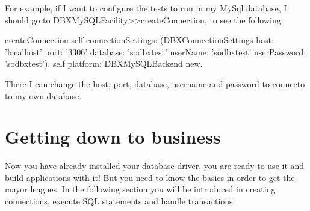 \documentclass[a4paper,10pt,twoside]{book}
\begin{document}
For example, if I want to configure the tests to run in my MySql database, I should go to DBXMySQLFacility>>createConnection, to see the following:

\begin{code}
createConnection
    self connectionSettings: (DBXConnectionSettings
			    host: 'localhost'
			    port: '3306'
			    database: 'sodbxtest'
			    userName: 'sodbxtest'
			    userPassword: 'sodbxtest').
    self platform: DBXMySQLBackend new.
\end{code}

There I can change the host, port, database, username and password to connecto to my own database.

\section{Getting down to business}

Now you have already installed your database driver, you are ready to use it and build applications with it!  But you need to know the basics in order to get the mayor leagues.  In the following section you will be introduced in creating connections, execute SQL statements and handle transactions.

\ifx\wholebook\relax\else
   
   
\end{document}
